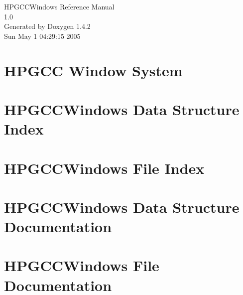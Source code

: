 \documentclass[a4paper]{book}
\begin{document}
\begin{titlepage}
\vspace*{7cm}
\begin{center}
{\Large HPGCCWindows Reference Manual\\[1ex]\large 1.0 }\\
\vspace*{1cm}
{\large Generated by Doxygen 1.4.2}\\
\vspace*{0.5cm}
{\small Sun May 1 04:29:15 2005}\\
\end{center}
\end{titlepage}
\clearemptydoublepage
{}
\tableofcontents
\clearemptydoublepage
{}
\chapter{HPGCC Window System }
\label{index}
\chapter{HPGCCWindows Data Structure Index}

\chapter{HPGCCWindows File Index}

\chapter{HPGCCWindows Data Structure Documentation}


\chapter{HPGCCWindows File Documentation}













\printindex
\end{document}
